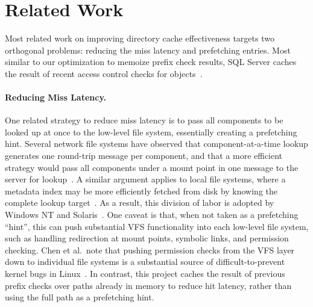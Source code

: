 \section{Related Work}
\label{sec:related}

Most related work on improving directory cache effectiveness targets
two orthogonal problems: reducing the miss latency and prefetching entries.
Most similar to our optimization to memoize 
prefix check results, SQL Server  caches the result of recent access control checks 
for objects~\cite{sql-memoize}.



\paragraph{Reducing Miss Latency.}
One related strategy to reduce miss latency is to pass all components to be looked up 
at once to the low-level file system, essentially creating a prefetching hint.
Several network file systems have observed that component-at-a-time lookup 
generates one round-trip message per component, and that a more efficient strategy
would pass all components under a mount point in one message to the server for lookup~\cite{duchamp94nfs,welch94comparison}.
A similar argument applies to local file systems, where a metadata index may be more efficiently fetched from disk
by knowing the complete lookup target~\cite{windowsinternals, lensing13dlfs}.
As a result, this division of labor is adopted by Windows NT and Solaris~\cite{windowsinternals,solarisinternals}.
One caveat is that, when not taken as a prefetching ``hint'', 
this can push substantial VFS functionality into each low-level file system, such as handling redirection at mount points, symbolic links,
and permission checking.
Chen et al.\ note that 
pushing permission checks from the VFS layer down to individual file systems 
is a substantial source of difficult-to-prevent kernel bugs in Linux~\cite{chen11kbugs}.
In contrast, this project caches the result of previous prefix checks over paths already in memory to reduce hit latency,
rather than using the full path as a prefetching hint.


